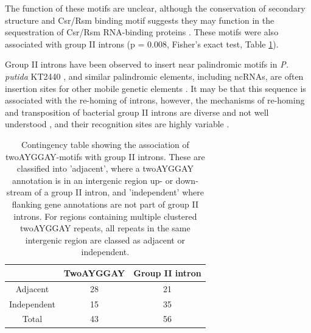 The function of these motifs are unclear, although the conservation of secondary structure and Csr/Rsm binding motif suggests they may function in the sequestration of Csr/Rsm RNA-binding proteins \citep{Gardner2015-co}. These motifs were also associated with group II introns (p = 0.008, Fisher's exact test, Table \ref{tab:fisher}). 

Group II introns have been observed to insert near palindromic motifs in \textit{P. putida} KT2440 \citep{Yeo2001-gg}, and similar palindromic elements, including ncRNAs, are often insertion sites for other mobile genetic elements \citep{Darmon2014-dxj,Dai2002-fm}. It may be that this sequence is associated with the re-homing of introns, however, the mechanisms of re-homing and transposition of bacterial group II introns are diverse and not well understood \citep{Dai2002-fm}, and their recognition sites are highly variable \citep{Lambowitz2011-oq}.
\begin{table}[H]
    \centering
    \begin{tabular}{c|cc}

         & TwoAYGGAY & Group II intron \\
        \midrule
         Adjacent & 28 & 21\\
         Independent & 15 & 35\\

         Total & 43 & 56 \\

    \end{tabular}
    \caption[Contingency table showing the association of twoAYGGAY-motifs with group II introns]{Contingency table showing the association of twoAYGGAY-motifs with group II introns. These are classified into 'adjacent', where a twoAYGGAY annotation is in an intergenic region up- or down-stream of a group II intron, and 'independent' where flanking gene annotations are not part of group II introns. For regions containing multiple clustered twoAYGGAY repeats, all repeats in the same intergenic region are classed as adjacent or independent.}
    \label{tab:fisher}
\end{table}


